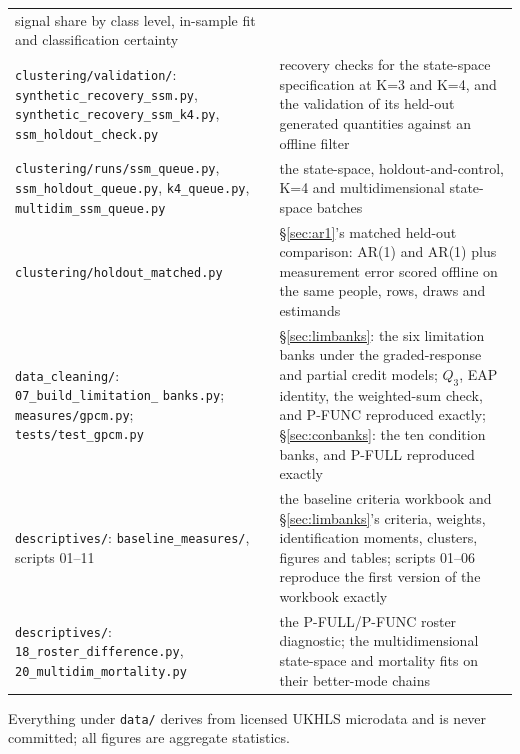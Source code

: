\documentclass[11pt]{article}
\newcommand{\code}[1]{\texttt{\small #1}}
\begin{document}
\begin{center}
\begin{tabular}{@{}>{\raggedright\arraybackslash}p{6.1cm}>{\raggedright\arraybackslash}p{8.0cm}@{}}
signal share by class level, in-sample fit and classification certainty \\
\code{clustering/validation/}: \code{synthetic\_recovery\_ssm.py},
\code{synthetic\_recovery\_ssm\_k4.py}, \code{ssm\_holdout\_check.py} &
recovery checks for the state-space specification at K=3 and K=4, and the
validation of its held-out generated quantities against an offline filter \\
\code{clustering/runs/ssm\_queue.py}, \code{ssm\_holdout\_queue.py},
\code{k4\_queue.py}, \code{multidim\_ssm\_queue.py} & the state-space,
holdout-and-control, K=4 and multidimensional state-space batches \\
\code{clustering/holdout\_matched.py} & \S\ref{sec:ar1}'s matched held-out
comparison: AR(1) and AR(1) plus measurement error scored offline on the same
people, rows, draws and estimands \\
\code{data\_cleaning/}: \code{07\_build\_limitation\_}
\code{banks.py}; \code{measures/gpcm.py}; \code{tests/test\_gpcm.py} & \S\ref{sec:limbanks}: the six
limitation banks under the graded-response and partial credit models; $Q_3$,
EAP identity, the weighted-sum check, and P-FUNC reproduced exactly;
\S\ref{sec:conbanks}: the ten condition banks, and P-FULL reproduced exactly \\
\code{descriptives/}: \code{baseline\_measures/}, scripts 01--11 & the baseline criteria workbook
and \S\ref{sec:limbanks}'s criteria, weights, identification moments,
clusters, figures and tables; scripts 01--06 reproduce the first version of
the workbook exactly \\
\code{descriptives/}: \code{18\_roster\_difference.py},
\code{20\_multidim\_mortality.py} & the P-FULL/P-FUNC roster diagnostic; the
multidimensional state-space and mortality fits on their better-mode chains \\
\bottomrule
\end{tabular}
\end{center}

Everything under \code{data/} derives from licensed UKHLS microdata and is
never committed; all figures are aggregate statistics.
\end{document}
